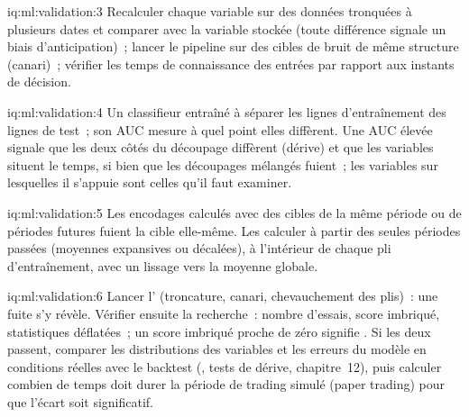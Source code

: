 \begin{solution}{iq:ml:validation:3}
Recalculer chaque variable sur des données tronquées à plusieurs dates et comparer avec la variable stockée (toute différence signale
un biais d'anticipation)~; lancer le pipeline sur des cibles de bruit de même structure (canari)~; vérifier les temps de connaissance des entrées
par rapport aux instants de décision.
\end{solution}

\begin{solution}{iq:ml:validation:4}
Un classifieur entraîné à séparer les lignes d'entraînement des lignes de test~; son AUC mesure à quel point elles diffèrent. Une AUC élevée signale
que les deux côtés du découpage diffèrent (dérive) et que les variables situent le temps, si bien que les découpages mélangés fuient~; les variables sur lesquelles il s'appuie
sont celles qu'il faut examiner.
\end{solution}

\begin{solution}{iq:ml:validation:5}
Les encodages calculés avec des cibles de la même période ou de périodes futures fuient la cible elle-même. Les calculer à partir des seules périodes passées
(moyennes expansives ou décalées), à l'intérieur de chaque pli d'entraînement, avec un lissage vers la moyenne globale.
\end{solution}

\begin{solution}{iq:ml:validation:6}
Lancer l' (troncature, canari, chevauchement des plis)~: une fuite s'y révèle. Vérifier ensuite la recherche~: nombre d'essais,
score imbriqué, statistiques déflatées~; un score imbriqué proche de zéro signifie . Si les deux passent, comparer les distributions des variables
et les erreurs du modèle en conditions réelles avec le backtest (, tests de dérive, chapitre~12), puis calculer
combien de temps doit durer la période de trading simulé (paper trading) pour que l'écart soit significatif.
\end{solution}
